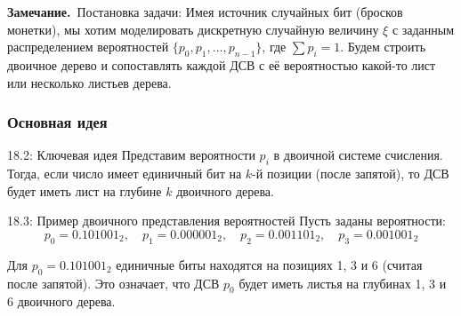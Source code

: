 \documentclass[a4paper,12pt]{article}
\newcommand{\myremark}{\textbf{Замечание.}\ }
\begin{document}
	\myremark{Постановка задачи:} Имея источник случайных бит (бросков монетки), мы хотим моделировать дискретную случайную величину \(\xi\) с заданным распределением вероятностей \(\{p_0, p_1, \dots, p_{n-1}\}\), где \(\sum p_i = 1\). Будем строить двоичное дерево и сопоставлять каждой ДСВ с её вероятностью какой-то лист или несколько листьев дерева.
	
	\subsubsection{Основная идея}
	
	\begin{remarkbox}{18.2: Ключевая идея}
		Представим вероятности \(p_i\) в двоичной системе счисления. Тогда, если число имеет единичный бит на \(k\)-й позиции (после запятой), то ДСВ будет иметь лист на глубине \(k\) двоичного дерева.
	\end{remarkbox}
	
	\begin{examplebox}{18.3: Пример двоичного представления вероятностей}
		Пусть заданы вероятности:
		\[ p_0 = 0.101001_2, \quad p_1 = 0.000001_2, \quad p_2 = 0.001101_2, \quad p_3 = 0.001001_2 \]
		
		Для \(p_0 = 0.101001_2\) единичные биты находятся на позициях 1, 3 и 6 (считая после запятой). Это означает, что ДСВ \(p_0\) будет иметь листья на глубинах 1, 3 и 6 двоичного дерева.
	\end{examplebox}
	
\end{document}
